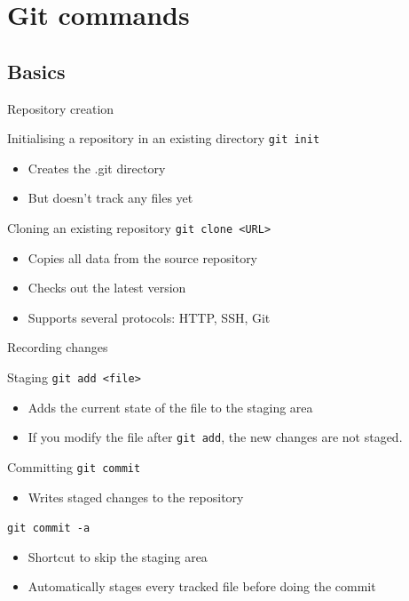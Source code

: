 \documentclass{beamer}
\begin{document}
\section{Git commands}

\subsection{Basics}

\begin{frame}{Repository creation}
  \begin{block}{Initialising a repository in an existing directory}
    \texttt{git init}
    \begin{itemize}
    \item Creates the .git directory
    \item But doesn't track any files yet
    \end{itemize}
  \end{block}
  \begin{block}{Cloning an existing repository}
    \texttt{git clone <URL>}
    \begin{itemize}
    \item Copies all data from the source repository
    \item Checks out the latest version
    \item Supports several protocols: HTTP, SSH, Git
    \end{itemize}
  \end{block}
\end{frame}

\begin{frame}{Recording changes}
  \begin{block}{Staging}
    \texttt{git add <file>}
    \begin{itemize}
    \item Adds the current state of the file to the staging area
    \item If you modify the file after \texttt{git add}, the \alert{new changes are not staged}.
    \end{itemize}
  \end{block}
  \begin{block}{Committing}
    \texttt{git commit}
    \begin{itemize}
    \item Writes staged changes to the repository
    \end{itemize}
    \texttt{git commit -a}
    \begin{itemize}
    \item Shortcut to skip the staging area
    \item Automatically stages every tracked file before doing the commit
    \end{itemize}
  \end{block}
\end{frame}
\end{document}
